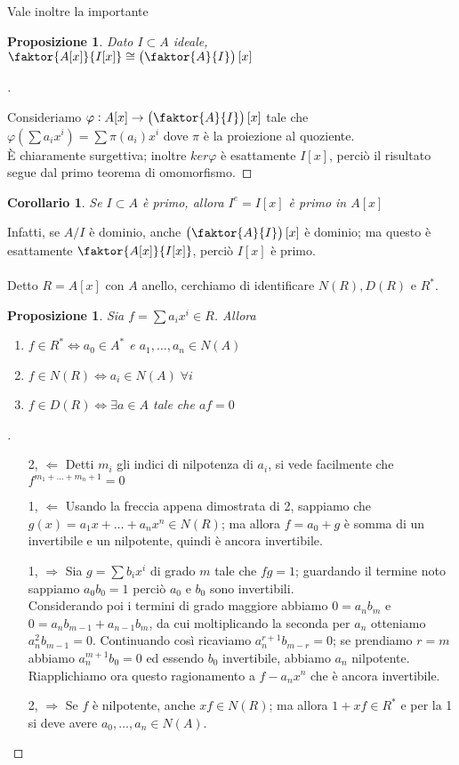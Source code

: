 \documentclass[a4paper,10pt]{article}
\theoremstyle{plain}
\newtheorem{prop}[thm]{Proposizione}
\newtheorem*{cor}{Corollario}
\theoremstyle{definition}
\newenvironment{myproof}[1][\proofname]{%
  \begin{proof}[#1]$ $\par\nobreak\ignorespaces
}{%
  \qedhere
  \end{proof}
}
\begin{document}
Vale inoltre la importante
\begin{prop}
    Dato $I\subset A$ ideale, $\displaystyle \faktor{A[x]}{I[x]}\cong \left(\faktor{A}{I}\right)[x]$
\end{prop}
\begin{myproof}
    Consideriamo $\displaystyle\varphi: A[x]\to \left(\faktor{A}{I}\right)[x]$ tale che $\displaystyle\varphi\left(\sum a_ix^i\right)=\sum \pi(a_i)x^i$ dove $\pi$ è la proiezione al quoziente.\\
    È chiaramente surgettiva; inoltre $ker\varphi$ è esattamente $I[x]$, perciò il risultato segue dal primo teorema di omomorfismo.
\end{myproof}
\begin{cor}
    Se $I\subset A$ è primo, allora $I^e=I[x]$ è primo in $A[x]$
\end{cor}
Infatti, se $A/I$ è dominio, anche $\left(\faktor{A}{I}\right)[x]$ è dominio; ma questo è esattamente $\faktor{A[x]}{I[x]}$, perciò $I[x]$ è primo.\\
\\
Detto $R=A[x]$ con $A$ anello, cerchiamo di identificare $N(R),D(R)$ e $R^\ast$.\\
\begin{prop}
    Sia $f=\sum a_ix^i\in R$. Allora
    \begin{enumerate}
        \item $f\in R^\ast \iff a_0\in A^\ast$ e $a_1,\dots,a_n\in N(A)$
        \item $f\in N(R)\iff a_i\in N(A)\;\forall i$
        \item $f\in D(R)\iff \exists a\in A$ tale che $af=0$
    \end{enumerate}
\end{prop}
\begin{myproof}
    \begin{itemize}
        \item[2, $\Leftarrow$] Detti $m_i$ gli indici di nilpotenza di $a_i$, si vede facilmente che $f^{m_1+\dots+m_n+1}=0$
        \item[1, $\Leftarrow$] Usando la freccia appena dimostrata di 2, sappiamo che $g(x)=a_1x+\dots+a_nx^n\in N(R)$; ma allora $f=a_0+g$ è somma di un invertibile e un nilpotente, quindi è ancora invertibile.
        \item[1, $\Rightarrow$] Sia $g=\sum b_ix^i$ di grado $m$ tale che $fg=1$; guardando il termine noto sappiamo $a_0b_0=1$ perciò $a_0$ e $b_0$ sono invertibili.\\
        Considerando poi i termini di grado maggiore abbiamo $0=a_nb_m$ e $0=a_nb_{m-1}+a_{n-1}b_m$, da cui moltiplicando la seconda per $a_n$ otteniamo $a_n^2b_{m-1}=0$.
        Continuando così ricaviamo $a_n^{r+1}b_{m-r}=0$; se prendiamo $r=m$ abbiamo $a_n^{m+1}b_0=0$ ed essendo $b_0$ invertibile, abbiamo $a_n$ nilpotente.\\
        Riapplichiamo ora questo ragionamento a $f-a_nx^n$ che è ancora invertibile.
        \item[2, $\Rightarrow$] Se $f$ è nilpotente, anche $xf\in N(R)$; ma allora $1+xf\in R^\ast$ e per la 1 si deve avere $a_0,\dots,a_n\in N(A)$.
    \end{itemize}
\end{myproof}
\end{document}
